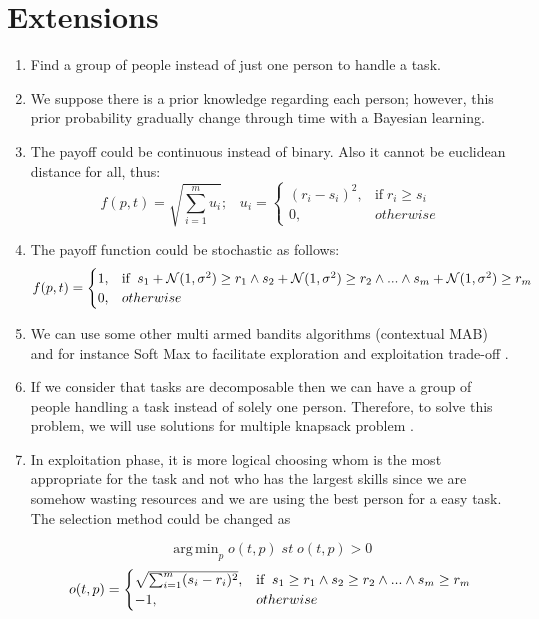 \documentclass[]{article}
\begin{document}
\section{Extensions}\label{extension}
\begin{enumerate}
	\item Find a group of people instead of just one person to handle a task.
	\item We suppose there is a prior knowledge regarding each person; however, this prior probability gradually change through time with a Bayesian learning.
	\item The payoff could be continuous instead of binary. Also it cannot be euclidean distance for all, thus: 
	\begin{equation}
		f(p,t) = \sqrt{\sum_{i=1}^{m}u_i};\;\;\;
		u_i = 
		\begin{cases}
			(r_i - s_i)^2,	& \text{if}\; r_i \geq s_i\\
			0,	& otherwise
		\end{cases}
	\end{equation}
	\item The payoff function could be stochastic as follows:
	\begin{equation}
		f(p,t) = 
		\begin{cases}
			1,	& \text{if\;\;} s_1 + \mathcal{N}(1,\sigma^2) \geq r_1 \wedge s_2 + \mathcal{N}(1,\sigma^2) \geq r_2 \wedge ... \wedge s_m + \mathcal{N}(1,\sigma^2) \geq r_m\\
			0,	& otherwise
		\end{cases}
	\end{equation}
	\item We can use some other multi armed bandits algorithms (contextual MAB) and for instance Soft Max to facilitate exploration and exploitation trade-off \cite{li2010contextual, kuleshov2014algorithms}.
	\item If we consider that tasks are decomposable then we can have a group of people handling a task instead of solely one person. Therefore, to solve this problem, we will use solutions for multiple knapsack problem \cite{chekuri2005polynomial}.
	\item In exploitation phase, it is more logical choosing whom is the most appropriate for the task and not who has the largest skills since we are somehow wasting resources and we are using the best person for a easy task. The selection method could be changed as
	
	\begin{equation}
		\operatorname{arg\,min}_p o(t,p)\;st\;o(t,p) > 0
	\end{equation}
	\begin{equation*}
		o(t,p) = 
		\begin{cases}
		\sqrt{\sum_{i=1}^{m}(s_i-r_i)^2},	& \text{if\;\;} s_1 \geq r_1 \wedge s_2 \geq r_2 \wedge ... \wedge s_m \geq r_m\\
		-1,	& otherwise
		\end{cases}
	\end{equation*}
	

\end{enumerate}
\end{document}
